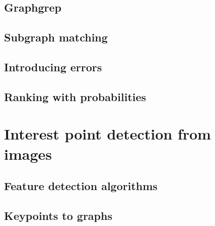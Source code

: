 \documentclass{article}
\begin{document}
\subsection{Graphgrep}

\subsection{Subgraph matching}

\subsection{Introducing errors}

\subsection{Ranking with probabilities}



\section{Interest point detection from images}

\subsection{Feature detection algorithms}

\subsection{Keypoints to graphs}
\end{document}
